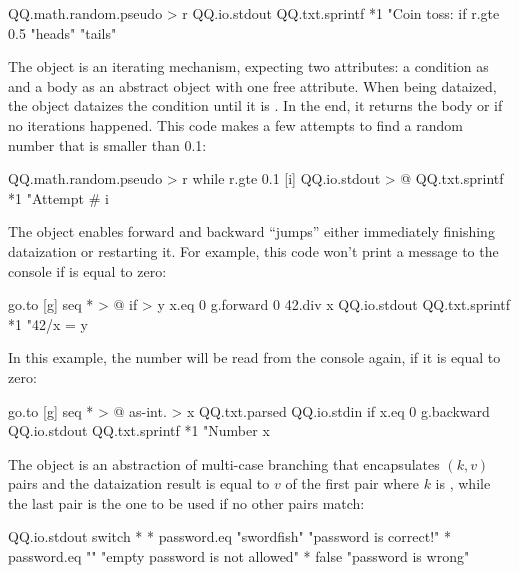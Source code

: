 \documentclass[sigplan,nonacm]{acmart}
\newcommand\aff[1]{\ff{\textcolor{gray}{\(\star\)}#1}}
\newcommand\deff[1]{\ff{\textcolor{blue!50!black}{\textbf{#1}}}}
\newcommand\adeff[1]{\aff{\textcolor{blue!50!black}{\textbf{#1}}}}
\begin{document}
\begin{ffcode}
QQ.math.random.pseudo > r
QQ.io.stdout
  QQ.txt.sprintf *1
    "Coin toss: %
    if
      r.gte 0.5
      "heads"
      "tails"
\end{ffcode}

The \adeff{while} object is an iterating mechanism, expecting two attributes: a condition as  and a body as an abstract object with one free attribute.
When being dataized, the object \aff{while} dataizes the condition until it is .
In the end, it returns the body or  if no iterations happened.
This code makes a few attempts to find a random number that is smaller than 0.1:

\begin{ffcode}
QQ.math.random.pseudo > r
while
  r.gte 0.1
  [i]
    QQ.io.stdout > @
      QQ.txt.sprintf *1
        "Attempt #%
        i
\end{ffcode}

The \adeff{go} object enables forward and backward ``jumps'' either immediately finishing dataization or restarting it.
For example, this code won't print a message to the console if  is equal to zero:

\begin{ffcode}
go.to
  [g]
    seq * > @
      if > y
        x.eq 0
        g.forward 0
        42.div x
      QQ.io.stdout
        QQ.txt.sprintf *1
          "42/x = %
          y
\end{ffcode}

In this example, the number will be read from the console again, if it is equal to zero:

\begin{ffcode}
go.to
  [g]
    seq * > @
      as-int. > x
        QQ.txt.parsed
          QQ.io.stdin
      if
        x.eq 0
        g.backward
        QQ.io.stdout
          QQ.txt.sprintf *1
            "Number %
            x
\end{ffcode}

The \deff{switch} object is an abstraction of multi-case branching that encapsulates \((k, v)\) pairs and the dataization result is equal to \(v\) of the first pair where \(k\) is , while the last pair is the one to be used if no other pairs match:

\begin{ffcode}
QQ.io.stdout
  switch *
    *
      password.eq "swordfish"
      "password is correct!"
    *
      password.eq ""
      "empty password is not allowed"
    *
      false
      "password is wrong"
\end{ffcode}
\end{document}
